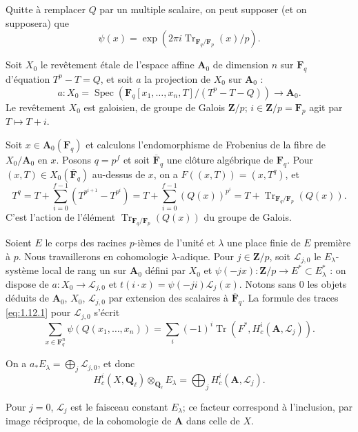\documentclass[12pt,a4paper]{amsart}
\theoremstyle{plain}
\theoremstyle{definition}
\theoremstyle{remark}
\DeclareMathOperator{\Tr}{Tr}
\DeclareMathOperator{\Spec}{Spec}
\newcommand{\Q}{\mathbf{Q}}
\newcommand{\Z}{\mathbf{Z}}
\newcommand{\F}{\mathbf{F}}
\numberwithin{equation}{section}
\begin{document}
Quitte \`a remplacer $Q$ par un multiple scalaire, on peut supposer (et on supposera) que
\begin{equation}\label{eq:8.4.1}
\psi(x) = \exp(2\pi i \Tr_{\F_q/\F_p}(x)/p).
\end{equation}

Soit $X_0$ le rev\^etement \'etale de l'espace affine $\mathbf{A}_0$ de dimension $n$ sur $\F_q$ d'\'equation $T^p-T=Q$, et soit $a$ la projection de $X_0$ sur $\mathbf{A}_0$ :
\[
a : X_0 = \Spec(\F_q[x_1,\ldots,x_n,T]/(T^p-T-Q)) \longrightarrow \mathbf{A}_0.
\]
Le rev\^etement $X_0$ est galoisien, de groupe de Galois $\Z/p$; $i\in\Z/p=\F_p$ agit par $T\mapsto T+i$.

Soit $x\in\mathbf{A}_0(\F_q)$ et calculons l'endomorphisme de Frobenius de la fibre de $X_0/\mathbf{A}_0$ en $x$. Posons $q=p^f$ et soit $\overline{\F}_q$ une cl\^oture alg\'ebrique de $\F_q$. Pour $(x,T)\in X_0(\overline{\F}_q)$ au-dessus de $x$, on a $F((x,T))=(x,T^q)$, et
\[
T^q = T + \sum_{i=0}^{f-1} (T^{p^{i+1}}-T^{p^i}) = T + \sum_{i=0}^{f-1} (Q(x))^{p^i} = T + \Tr_{\F_q/\F_p}(Q(x)).
\]
C'est l'action de l'\'el\'ement $\Tr_{\F_q/\F_p}(Q(x))$ du groupe de Galois.

Soient $E$ le corps des racines $p$-i\`emes de l'unit\'e et $\lambda$ une place finie de $E$ premi\`ere \`a $p$. Nous travaillerons en cohomologie $\lambda$-adique. Pour $j\in\Z/p$, soit $\mathscr{L}_{j,0}$ le $E_\lambda$-syst\`eme local de rang un sur $\mathbf{A}_0$ d\'efini par $X_0$ et $\psi(-jx):\Z/p\to E^\ast\subset E_\lambda^\ast$ : on dispose de $a:X_0\to\mathscr{L}_{j,0}$ et $t(i\cdot x)=\psi(-ji)\mathscr{L}_j(x)$. Notons sans $0$ les objets d\'eduits de $\mathbf{A}_0$, $X_0$, $\mathscr{L}_{j,0}$ par extension des scalaires \`a $\overline{\F}_q$. La formule des traces \eqref{eq:1.12.1} pour $\mathscr{L}_{j,0}$ s'\'ecrit
\begin{equation}\label{eq:8.4.2}
\sum_{x\in\F_q^n} \psi(Q(x_1,\ldots,x_n)) = \sum_i (-1)^i \Tr(F^\ast, H^i_c(\mathbf{A}, \mathscr{L}_j)).
\end{equation}

On a $a_\ast E_\lambda = \bigoplus_j \mathscr{L}_{j,0}$, et donc
\begin{equation}\label{eq:8.4.3}
H^i_c(X,\Q_\ell) \otimes_{\Q_\ell} E_\lambda = \bigoplus_j H^i_c(\mathbf{A}, \mathscr{L}_j).
\end{equation}

Pour $j=0$, $\mathscr{L}_j$ est le faisceau constant $E_\lambda$; ce facteur correspond \`a l'inclusion, par image r\'eciproque, de la cohomologie de $\mathbf{A}$ dans celle de $X$.
\end{document}
